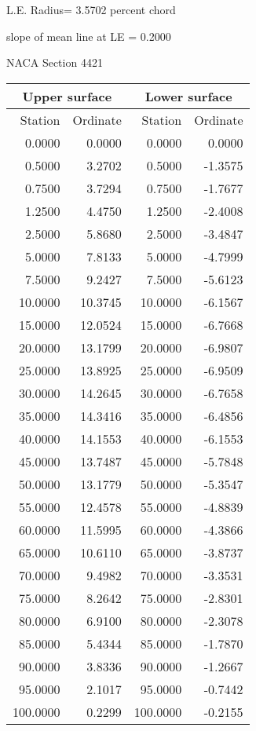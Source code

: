 \documentclass[11pt]{book}
\begin{document}
L.E. Radius=  3.5702 percent chord


 slope of mean line at LE =  0.2000
 \newpage
  \label{s4421}
 \begin{Large}
 NACA Section 4421
 \end{Large}
  
 \vspace{8mm}
 \begin{tabular}{|r|r|r|r|} \hline 
 \multicolumn{2}{|c|}{Upper surface} & \multicolumn{2}{|c|}{Lower surface} \\
 \hline
 Station & Ordinate & Station & Ordinate \\
 \hline
0.0000 & 0.0000 & 0.0000 & 0.0000 \\
0.5000 & 3.2702 & 0.5000 & -1.3575 \\
0.7500 & 3.7294 & 0.7500 & -1.7677 \\
1.2500 & 4.4750 & 1.2500 & -2.4008 \\
2.5000 & 5.8680 & 2.5000 & -3.4847 \\
5.0000 & 7.8133 & 5.0000 & -4.7999 \\
7.5000 & 9.2427 & 7.5000 & -5.6123 \\
10.0000 & 10.3745 & 10.0000 & -6.1567 \\
15.0000 & 12.0524 & 15.0000 & -6.7668 \\
20.0000 & 13.1799 & 20.0000 & -6.9807 \\
25.0000 & 13.8925 & 25.0000 & -6.9509 \\
30.0000 & 14.2645 & 30.0000 & -6.7658 \\
35.0000 & 14.3416 & 35.0000 & -6.4856 \\
40.0000 & 14.1553 & 40.0000 & -6.1553 \\
45.0000 & 13.7487 & 45.0000 & -5.7848 \\
50.0000 & 13.1779 & 50.0000 & -5.3547 \\
55.0000 & 12.4578 & 55.0000 & -4.8839 \\
60.0000 & 11.5995 & 60.0000 & -4.3866 \\
65.0000 & 10.6110 & 65.0000 & -3.8737 \\
70.0000 & 9.4982 & 70.0000 & -3.3531 \\
75.0000 & 8.2642 & 75.0000 & -2.8301 \\
80.0000 & 6.9100 & 80.0000 & -2.3078 \\
85.0000 & 5.4344 & 85.0000 & -1.7870 \\
90.0000 & 3.8336 & 90.0000 & -1.2667 \\
95.0000 & 2.1017 & 95.0000 & -0.7442 \\
100.0000 & 0.2299 & 100.0000 & -0.2155 \\
 \hline 
 \end{tabular}
\end{document}
